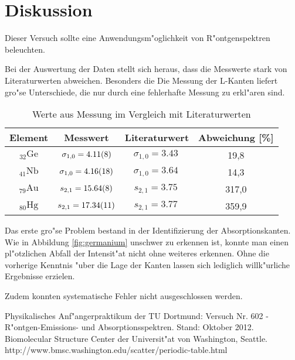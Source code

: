 \newpage
\section{Diskussion}
	\label{sec:diskussion}
	Dieser Versuch sollte eine Anwendungsm"oglichkeit von R"ontgenspektren beleuchten.

	Bei der Auswertung der Daten stellt sich heraus, dass die Messwerte stark von Literaturwerten abweichen. Besonders die Die Messung der L-Kanten liefert gro"se Unterschiede, die nur durch eine fehlerhafte Messung zu erkl"aren sind.

	\begin{table}
		\centering
		\caption{Werte aus Messung im Vergleich mit Literaturwerten \cite{literatur}}
		\begin{tabular}{|c|c|c|c|}
			\hline
			Element & Messwert & Literaturwert & Abweichung [\%] \\
			\hline
			\hline
			${}_{32}^{}\mathrm{Ge}$ & $\sigma_{1,0} = \SI{4.11 (8)}{}$ & $\sigma_{1,0} = \SI{3.43}{}$ & 19,8 \\
			${}_{41}^{}\mathrm{Nb}$ & $\sigma_{1,0} = \SI{4.16 (18)}{}$ & $\sigma_{1,0} = \SI{3.64}{}$ & 14,3 \\
			${}_{79}^{}\mathrm{Au}$ & $s_{2,1} = \SI{15.64 (8)}{}$ & $s_{2,1} = \SI{3.75}{}$ & 317,0 \\
			${}_{80}^{}\mathrm{Hg}$ & $s_{2,1} = \SI{17.34 (11)}{}$ & $s_{2,1} = \SI{3.77}{}$ & 359,9 \\
			\hline
		\end{tabular}		
	\end{table}

	Das erste gro"se Problem bestand in der Identifizierung der Absorptionskanten.
	Wie in Abbildung \ref{fig:germanium} unschwer zu erkennen ist, konnte man einen pl"otzlichen Abfall der Intensit"at nicht ohne weiteres erkennen.
	Ohne die vorherige Kenntnis "uber die Lage der Kanten lassen sich lediglich willk"urliche Ergebnisse erzielen.

	Zudem konnten systematische Fehler nicht ausgeschlossen werden.
	
\begin{thebibliography}{9}
	 Physikalisches Anf"angerpraktikum der TU Dortmund: Versuch Nr. 602 - R"ontgen-Emissions- und Absorptionsspektren. Stand: Oktober 2012.
	 Biomolecular Structure Center der Universit"at von Washington, Seattle. http://www.bmsc.washington.edu/scatter/periodic-table.html
\end{thebibliography}